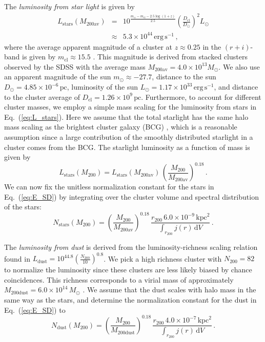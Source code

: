 \documentclass[10pt,aps,pra,reprint,amsmath,amsfonts,amssymb,showpacs,nofootinbib,floatfix]{revtex4-1}
\newcommand{\rmn}{\mathrm}
\newcommand{\clu}{\rmn{cl}}
\newcommand{\msun}{M_\odot}
\newcommand{\stars}{\rmn{stars}}
\newcommand{\dust}{\rmn{dust}}
\newcommand{\kpc}{\rmn{kpc}}
\newcommand{\dd}{\rmn{d}}
\newcommand{\rvir}{r_{200}}
\newcommand{\mvir}{M_{200}}
\begin{document}
The {\em luminosity from star light} is given by
\begin{eqnarray}
L_\stars(M_{200\rmn{av}})&=&10^{\frac{m_\odot-m_\rmn{cl}-2.5\log\left(1+z\right)}{2.5}}
\left(\frac{D_\clu}{D_\odot}\right)^2 L_\odot\nonumber\\
&\approx& 5.3\times10^{44}\,\rmn{erg}\,\rmn{s}^{-1}\,,
\label{eq:L_stars}
\end{eqnarray}
where the average apparent magnitude of a cluster at $z\approx 0.25$
in the $(r+i)$-band is given by $m_\rmn{cl}\approx 15.5$
\cite{2005MNRAS.358..949Z}. This magnitude is derived from stacked
clusters observed by the SDSS with the average mass
$M_{200\rmn{av}}=4.0\times10^{13}\msun$. We also use an apparent
magnitude of the sun $m_\odot\approx -27.7$, distance to the sun
$D_\odot=4.85\times10^{-6}\,\rmn{pc}$, luminosity of the sun
$L_\odot=1.17\times10^{33}\,\rmn{erg\,s}^{-1}$, and distance to the
cluster average of $D_\clu=1.26\times10^9\,\rmn{pc}$. Furthermore, to account for
different cluster masses, we employ a simple mass scaling for the
luminosity from stars in Eq.~(\ref{eq:L_stars}). Here we assume
that the total starlight has the same halo mass scaling as the
brightest cluster galaxy (BCG) \cite{2010ApJ...713.1037H}, which is a
reasonable assumption since a large contribution of the smoothly distributed
starlight in a cluster comes from the BCG. The starlight luminosity as
a function of mass is given by
\begin{equation}
L_\stars(\mvir)=L_\stars(M_{200\rmn{av}})\,
\left(\frac{\mvir}{M_{200\rmn{av}}}\right)^{0.18}\,.
\label{eq:L_stars_m}
\end{equation}
We can now fix the unitless normalization constant for the stars in
Eq.~(\ref{eq:E_SD}) by integrating over the cluster volume and
spectral distribution of the stars:
\begin{equation}
 N_\stars(\mvir) =
\left(\frac{\mvir}{M_{200\rmn{av}}}\right)^{0.18}\,
\frac{\rvir\, 6.0\times10^{-9}\,\kpc^2}{\int_{\rvir} j(r) \,\dd V}\,.
\label{eq:N_stars}
\end{equation}

The {\em luminosity from dust} is derived from the
luminosity-richness scaling relation found in
\cite{2008A&A...490..547G}
$L_\dust=10^{44.8}\left(\frac{N_{200}}{10}\right)^{0.8}$. We pick a
high richness cluster with $N_{200}=82$ to normalize the luminosity
since these clusters are less likely biased by chance
coincidences. This richness corresponds to a virial mass of approximately
$M_\rmn{200dust}=6.0\times10^{14}\,\msun$
\cite{2010ApJ...713.1037H}. We assume that the dust scales with halo
mass in the same way as the stars, and determine the normalization
constant for the dust in Eq.~(\ref{eq:E_SD}) to
\begin{equation}
 N_\dust(\mvir) =
\left(\frac{\mvir}{M_\rmn{200dust}}\right)^{0.18}\,
\frac{\rvir\,4.0\times10^{-7}\,\kpc^2}{\int_{\rvir} j(r) \,\dd V}\,.
\label{eq:N_dust}
\end{equation}
\end{document}
